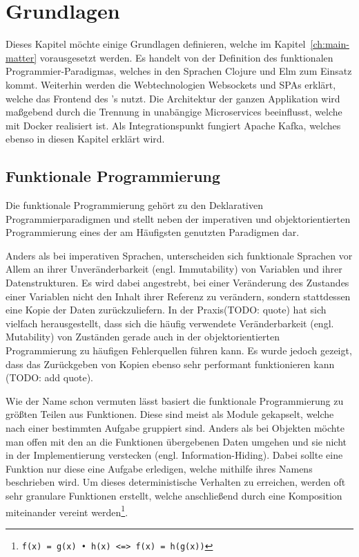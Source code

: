 \chapter{Grundlagen}
\label{ch:fundamentals}

Dieses Kapitel möchte einige Grundlagen definieren, welche im Kapitel~\ref{ch:main-matter} vorausgesetzt werden.
Es handelt von der Definition des funktionalen Programmier-Paradigmas, welches in den Sprachen Clojure und Elm zum Einsatz kommt.
Weiterhin werden die Webtechnologien Websockets und \acp{SPA} erklärt, welche das Frontend des 's nutzt. 
Die Architektur der ganzen Applikation wird maßgebend durch die Trennung in unabängige Microservices beeinflusst, welche mit Docker realisiert ist.
Als Integrationspunkt fungiert Apache Kafka, welches ebenso in diesen Kapitel erklärt wird.
\section{Funktionale Programmierung}
Die funktionale Programmierung gehört zu den Deklarativen Programmierparadigmen und stellt neben der imperativen und objektorientierten Programmierung eines der am Häufigsten genutzten Paradigmen dar.
\par
Anders als bei imperativen Sprachen, unterscheiden sich funktionale Sprachen vor Allem an ihrer Unveränderbarkeit (engl. Immutability) von Variablen und ihrer Datenstrukturen.
Es wird dabei angestrebt, bei einer Veränderung des Zustandes einer Variablen nicht den Inhalt ihrer Referenz zu verändern, sondern stattdessen eine Kopie der Daten zurückzuliefern.
In der Praxis(TODO: quote) hat sich vielfach herausgestellt, dass sich die häufig verwendete Veränderbarkeit (engl. Mutability) von Zuständen gerade auch in der objektorientierten Programmierung zu häufigen Fehlerquellen führen kann.
Es wurde jedoch gezeigt, dass das Zurückgeben von Kopien ebenso sehr performant funktionieren kann (TODO: add quote).
\par
Wie der Name schon vermuten lässt basiert die funktionale Programmierung zu größten Teilen aus Funktionen. 
Diese sind meist als Module gekapselt, welche nach einer bestimmten Aufgabe gruppiert sind. 
Anders als bei Objekten möchte man offen mit den an die Funktionen übergebenen Daten umgehen und sie nicht in der Implementierung verstecken (engl. Information-Hiding). 
Dabei sollte eine Funktion nur diese eine Aufgabe erledigen, welche mithilfe ihres Namens beschrieben wird. 
Um dieses deterministische Verhalten zu erreichen, werden oft sehr granulare Funktionen erstellt, welche anschließend durch eine Komposition miteinander vereint werden\footnote{\texttt{f(x) = g(x) • h(x) <=> f(x) = h(g(x))}}.
